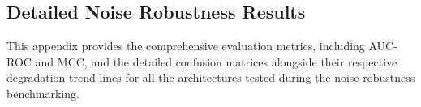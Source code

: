 \documentclass[a4paper,fleqn]{cas-dc}
\begin{document}
\newpage 

 


\clearpage
\appendix

\begin{strip}
	\section{Detailed Noise Robustness Results}
	\label{sec:appendix_matrices}
	
	This appendix provides the comprehensive evaluation metrics, including AUC-ROC and MCC, and the detailed confusion matrices alongside their respective degradation trend lines for all the architectures tested during the noise robustness benchmarking.
	
	\vspace{1em}
	

\end{strip}
\end{document}
